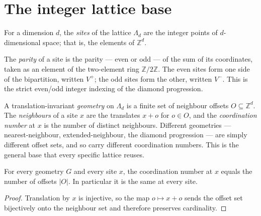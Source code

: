 
\chapter{The integer lattice base}

\begin{definition}[Sites]
  \label{def:site}
  \leanok
  For a dimension $d$, the \emph{sites} of the lattice $\Lambda_d$ are the
  integer points of $d$-dimensional space; that is, the elements of
  $\mathbb{Z}^d$.
\end{definition}

\begin{definition}
  \label{def:parity}
  \leanok
  The \emph{parity} of a site is the parity --- even or odd --- of the sum of
  its coordinates, taken as an element of the two-element ring
  $\mathbb{Z}/2\mathbb{Z}$. The even sites form one side of the bipartition,
  written $V^{+}$; the odd sites form the other, written $V^{-}$. This is the
  strict even/odd integer indexing of the diamond progression.
\end{definition}

\begin{definition}
  \label{def:geometry}
  \leanok
  A translation-invariant \emph{geometry} on $\Lambda_d$ is a finite set of
  neighbour offsets $O \subseteq \mathbb{Z}^d$. The \emph{neighbours} of a site
  $x$ are the translates $x + o$ for $o \in O$, and the \emph{coordination
  number} at $x$ is the number of distinct neighbours. Different geometries ---
  nearest-neighbour, extended-neighbour, the diamond progression --- are simply
  different offset sets, and so carry different coordination numbers. This is
  the general base that every specific lattice reuses.
\end{definition}

\begin{lemma}
  \label{lem:coord_card}
  \leanok
  For every geometry $G$ and every site $x$, the coordination number at $x$
  equals the number of offsets $\lvert O \rvert$. In particular it is the same
  at every site.
\end{lemma}
\begin{proof}
  \leanok
  Translation by $x$ is injective, so the map $o \mapsto x + o$ sends the offset
  set bijectively onto the neighbour set and therefore preserves cardinality.
\end{proof}

